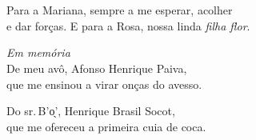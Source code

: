 



\chapter*{}
\thispagestyle{empty}

\vfill
\begin{flushright}
\small
Para a Mariana, sempre a me esperar, acolher\\e dar forças. E para a Rosa, nossa linda \textit{filha flor}.

\bigskip

\textit{Em memória}\\
\smallskip
De meu avô, Afonso Henrique Paiva,\\que me ensinou a virar onças do avesso.

\smallskip

Do sr.\,B'o̖', Henrique Brasil Socot,\\que me ofereceu a primeira cuia de coca.
\end{flushright}